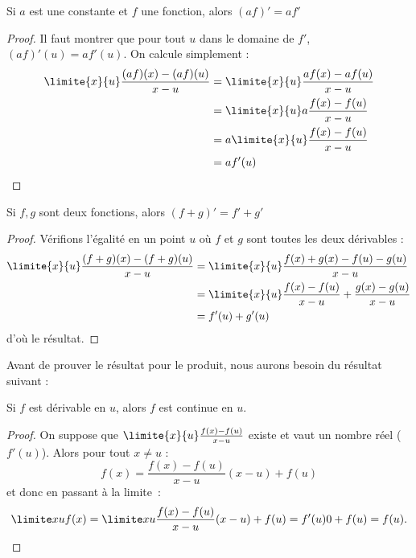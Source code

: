 \begin{frame}
  \begin{proposition}Si \(a\) est une constante et \(f\) une fonction, alors
    \((af)'= a f'\)
  \end{proposition}
  \begin{proof}\pause %
    Il faut montrer que pour tout \(u\) dans le domaine de \(f'\), \((af)'(u) = a f'(u)\).\pause{}
    On calcule simplement :
    \begin{align*}
      \limite{x}{u} \frac{(af)(x)-(af)(u)}{x-u} &= \limite{x}{u} \frac{a f(x) - a f(u)}{x-u}\\
                                                &= \limite{x}{u} a \frac{f(x) - f(u)}{x-u}\\
                                                &= a \limite{x}{u} \frac{f(x) - f(u)}{x-u}\\
                                                &= a f'(u)\\
    \end{align*}
  \end{proof}
\end{frame}
\begin{frame}
  \begin{proposition}
    Si \(f,g\) sont deux fonctions, alors $(f + g)' = f' + g'$
  \end{proposition}
  \begin{proof}\pause %
    Vérifions l'égalité en un point \(u\) où \(f\) et \(g\) sont toutes les deux dérivables :
    \begin{align*}
      \limite{x}{u} \frac{(f+g)(x)-(f+g)(u)}{x-u} &= \limite{x}{u} \frac{f(x) + g(x) - f(u) - g(u)}{x-u}\\
                                                  &= \limite{x}{u} \frac{f(x) - f(u)}{x-u} + \frac{g(x) - g(u)}{x-u}\\
      &= f'(u) + g'(u)
    \end{align*}
    d'où le résultat.
  \end{proof}
\end{frame}
\begin{frame}%
  Avant de prouver le résultat pour le produit, nous aurons besoin du résultat suivant :
  \begin{proposition}
    Si \(f\) est dérivable en \(u\), alors \(f\) est continue en \(u\).
  \end{proposition}
  \begin{proof}\pause 
    On suppose que \(\limite{x}{u} \frac{f(x)-f(u)}{x-u}\) existe et vaut un nombre réel (\(f'(u)\)). Alors pour tout \(x \neq u\) :
    \begin{equation*}
      f(x) = \frac{f(x)-f(u)}{x-u} (x-u) + f(u)
    \end{equation*}\pause
    et donc en passant à la limite~:
    \begin{equation*}
      \limite x u f(x) = \limite x u \frac{f(x)-f(u)}{x-u} (x-u) + f(u) = f'(u) 0+ f(u) = f(u).
    \end{equation*}
  \end{proof}
\end{frame}
